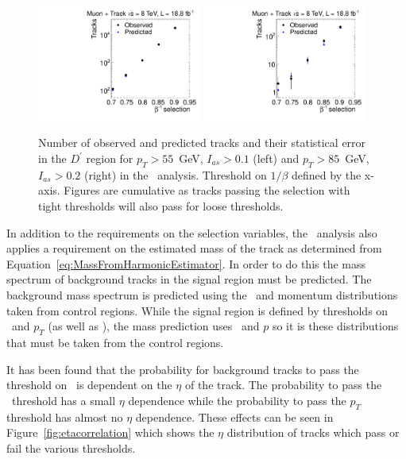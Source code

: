 \begin{figure}
\begin{center}
\includegraphics[clip=false, trim=0.0cm 0cm 0.0cm 0cm, width=0.48\textwidth]{figures/tkmu/Pred_Flip_I010_Pt55_Data8TeV}
\includegraphics[clip=false, trim=0.0cm 0cm 0.0cm 0cm, width=0.48\textwidth]{figures/tkmu/Pred_Flip_I020_Pt85_Data8TeV}
\caption[Number of observed and predicted tracks in the \invbeta\ $<$ 1 region in the \tktof\ analysis.]
{Number of observed and predicted tracks and their statistical error in the $D^\prime$ region for $p_T>55$~GeV, $I_{as}>0.1$ (left)
and $p_T>85$~GeV, $I_{as}>0.2$ (right) in the \tktof\ analysis. Threshold on $1/\beta$ defined by the x-axis.
Figures are cumulative as tracks passing the selection with tight thresholds will also pass for loose thresholds.}
\label{fig:PredFlipTkTOF}
\end{center}
\end{figure}

In addition to the requirements on the selection variables, the \tktof\ analysis also applies a requirement on the estimated mass of the track as determined from 
Equation~\ref{eq:MassFromHarmonicEstimator}. In order to do this the mass spectrum of background tracks in the signal region must be predicted.
The background mass spectrum is predicted using the \dedx\ and momentum distributions taken from control regions. While the signal region is defined by thresholds on \ias\ and
$p_T$ (as well as \invbeta), the mass prediction uses \ih\ and $p$ so it is these distributions that must be taken from the control regions. 

It has been found that the probability for background tracks to pass the threshold on \ias\ is dependent on the $\eta$ of the track.
The probability to pass the \invbeta\ threshold has a small $\eta$
dependence while the probability to pass the $p_T$ threshold has almost no $\eta$ dependence. These effects can be seen in Figure~\ref{fig:etacorrelation} which shows the $\eta$
distribution of tracks which
pass or fail the various thresholds. 

